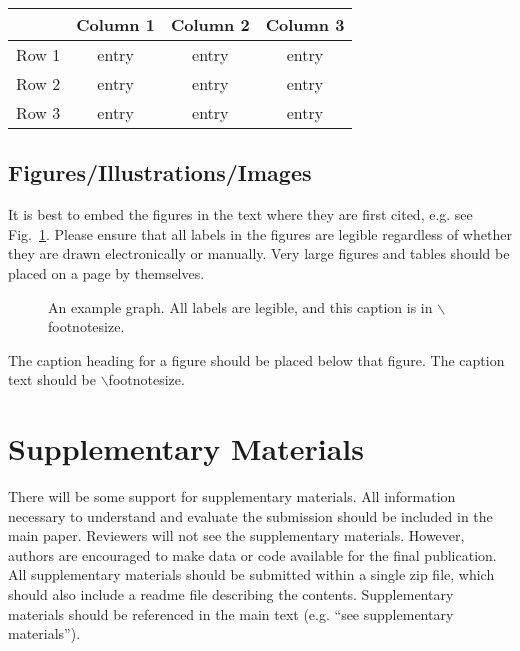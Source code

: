 \documentclass{evolang11}
\begin{document}
\begin{table}[ht]
{\footnotesize
\begin{tabular}{@{}cccc@{}}
\hline
 & Column 1 & Column 2 & Column 3\\
\hline
Row 1 & entry & entry & entry \\
Row 2 & entry & entry & entry \\
Row 3 & entry & entry & entry \\

\hline
\end{tabular}\label{table1}}
\end{table}


\subsection{Figures/Illustrations/Images}

It is best to embed the figures in the text where they are first cited,
e.g. see Fig.~\ref{inter}. Please ensure that all labels in the
figures are legible regardless of whether they are drawn electronically or manually.  Very large figures and tables should be placed
on a page by themselves.


\begin{figure}[ht]
\begin{center}
\end{center}
\caption{{\footnotesize An example graph.  All labels are legible, and
    this caption is in $\backslash$footnotesize. \label{inter}}}
\end{figure}

The caption heading for a figure should be placed below that figure.
The caption text should be $\backslash$footnotesize.

\section{Supplementary Materials}

There will be some support for supplementary materials.  All information necessary to understand and evaluate the submission should be included in the main paper.  Reviewers will not see the supplementary materials.  However, authors are encouraged to make data or code available for the final publication.  All supplementary materials should be submitted within a single zip file, which should also include a readme file describing the contents.  Supplementary materials should be referenced in the main text (e.g. ``see supplementary materials'').
\end{document}
